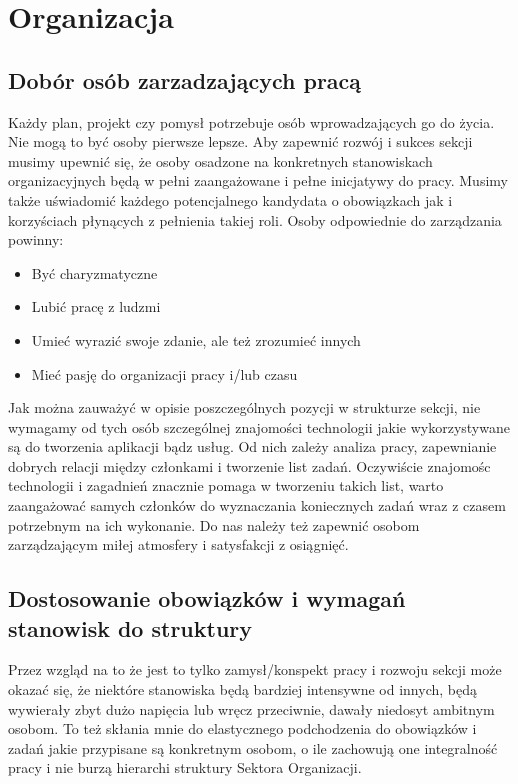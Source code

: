 \documentclass[9pt,a4paper]{report}
\begin{document}
\chapter{Organizacja}

\section{Dobór osób zarzadzających pracą}

Każdy plan, projekt czy pomysł potrzebuje osób wprowadzających go do życia. Nie mogą to być osoby pierwsze lepsze. Aby zapewnić rozwój i sukces sekcji musimy upewnić się, że osoby osadzone na konkretnych stanowiskach organizacyjnych będą w pełni zaangażowane i pełne inicjatywy do pracy. Musimy także uświadomić każdego potencjalnego kandydata o obowiązkach jak i korzyściach płynących z pełnienia takiej roli. Osoby odpowiednie do zarządzania powinny:\\
\begin{itemize}
\item Być charyzmatyczne
\item Lubić pracę z ludzmi
\item Umieć wyrazić swoje zdanie, ale też zrozumieć innych
\item Mieć pasję do organizacji pracy i/lub czasu
\end{itemize}
Jak można zauważyć w opisie poszczególnych pozycji w strukturze sekcji, nie wymagamy od tych osób szczególnej znajomości technologii jakie wykorzystywane są do tworzenia aplikacji bądz usług. Od nich zależy analiza pracy, zapewnianie dobrych relacji między członkami i tworzenie list zadań. Oczywiście znajomośc technologii i zagadnień znacznie pomaga w tworzeniu takich list, warto zaangażować samych członków do wyznaczania koniecznych zadań wraz z czasem potrzebnym na ich wykonanie. Do nas należy też zapewnić osobom zarządzającym miłej atmosfery i satysfakcji z osiągnięć.

\section{Dostosowanie obowiązków i wymagań stanowisk do struktury}

Przez wzgląd na to że jest to tylko zamysł/konspekt pracy i rozwoju sekcji może okazać się, że niektóre stanowiska będą bardziej intensywne od innych, będą wywierały zbyt dużo napięcia lub wręcz przeciwnie, dawały niedosyt ambitnym osobom. To też skłania mnie do elastycznego podchodzenia do obowiązków i zadań jakie przypisane są konkretnym osobom, o ile zachowują one integralność pracy i nie burzą hierarchi struktury Sektora Organizacji.\\\\
\end{document}
